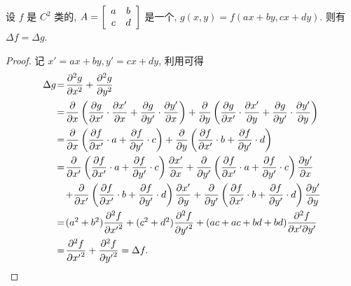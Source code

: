 \begin{property}[拉普拉斯算子在正交变换下的不变性]\label{拉普拉斯算子在正交变换下的不变性}
	设 $f$ 是 $C^2$ 类的, $\\ \\A=\left[\begin{array}{cc}
		a & b \\
		c & d
	\end{array}\right]$ 是一个, $g(x,y)=f(ax+by,cx+dy)$. 则有 $\Delta f = \Delta g$.
\end{property}
\begin{proof}
	记 $x'=ax+by,y'=cx+dy$, 利用可得
	\begin{equation*}
		\setlength{\arraycolsep}{0.5pt}
		\begin{array}{rcl}
			\Delta g &=& \dfrac{\partial^2 g}{\partial x^2} + \dfrac{\partial^2 g}{\partial y^2} \\[10pt]
			&=& \dfrac{\partial }{\partial x}\left(\dfrac{\partial g}{\partial x'}\cdot\dfrac{\partial x'}{\partial x}+\dfrac{\partial g}{\partial y'}\cdot\dfrac{\partial y'}{\partial x}\right)+\dfrac{\partial }{\partial y}\left(\dfrac{\partial g}{\partial x'}\cdot\dfrac{\partial x'}{\partial y}+\dfrac{\partial g}{\partial y'}\cdot\dfrac{\partial y'}{\partial y}\right) \\[10pt]
			&=&\dfrac{\partial }{\partial x}\left(\dfrac{\partial f}{\partial x'}\cdot a+\dfrac{\partial f}{\partial y'}\cdot c\right)+\dfrac{\partial }{\partial y}\left(\dfrac{\partial f}{\partial x'}\cdot b+\dfrac{\partial f}{\partial y'}\cdot d\right) \\[10pt]
			&=&\dfrac{\partial }{\partial x'}\left(\dfrac{\partial f}{\partial x'}\cdot a+\dfrac{\partial f}{\partial y'}\cdot c\right)\dfrac{\partial x'}{\partial x}+\dfrac{\partial }{\partial y'}\left(\dfrac{\partial f}{\partial x'}\cdot a+\dfrac{\partial f}{\partial y'}\cdot c\right)\dfrac{\partial y'}{\partial x} \\[10pt]
			&&+\dfrac{\partial }{\partial x'}\left(\dfrac{\partial f}{\partial x'}\cdot b+\dfrac{\partial f}{\partial y'}\cdot d\right)\dfrac{\partial x'}{\partial y}+\dfrac{\partial }{\partial y'}\left(\dfrac{\partial f}{\partial x'}\cdot b+\dfrac{\partial f}{\partial y'}\cdot d\right)\dfrac{\partial y'}{\partial y} \\[10pt]
			&=& (a^2+b^2)\dfrac{\partial^2 f}{\partial {x'}^2}+(c^2+d^2)\dfrac{\partial^2 f}{\partial {y'}^2}+(ac+ac+bd+bd)\dfrac{\partial^2 f}{\partial x'\partial y'}\\[10pt]
			&=& \dfrac{\partial^2 f}{\partial {x'}^2}+\dfrac{\partial^2 f}{\partial {y'}^2} = \Delta f.
		\end{array}
	\end{equation*}


\end{proof}
